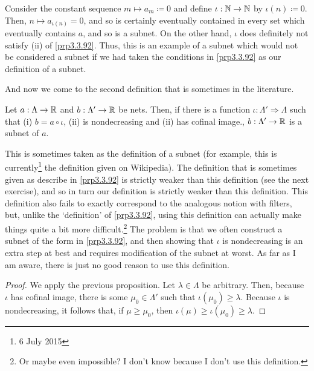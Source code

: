 \begin{exm}\label{exm3.3.93}
Consider the constant sequence $m\mapsto a_m\coloneqq 0$ and define $\iota :\mathbb{N} \rightarrow \mathbb{N}$ by $\iota (n)\coloneqq 0$.  Then, $n\mapsto a_{\iota (n)}=0$, and so is certainly eventually contained in every set which eventually contains $a$, and so is a subnet.  On the other hand, $\iota$ does definitely not satisfy (ii) of \cref{prp3.3.92}.  Thus, this is an example of a subnet which would not be considered a subnet if we had taken the conditions in \cref{prp3.3.92} as our definition of a subnet.
\end{exm}
And now we come to the second definition that is sometimes in the literature.
\begin{prp}\label{prp3.3.93}
Let $a:\Lambda \rightarrow \mathbb{R}$ and $b:\Lambda '\rightarrow \mathbb{R}$ be nets.  Then, if there is a function $\iota :\Lambda '\Rightarrow \Lambda$ such that (i) $b=a\circ \iota$, (ii) is nondecreasing and (ii) has cofinal image., $b:\Lambda '\rightarrow \mathbb{R}$ is a subnet of $a$.
\begin{rmk}
This is sometimes taken as the definition of a subnet (for example, this is currently\footnote{6 July 2015} the definition given on Wikipedia).  The definition that is sometimes given as describe in \cref{prp3.3.92} is strictly weaker than this definition (see the next exercise), and so in turn our definition is strictly weaker than this definition.  This definition also fails to exactly correspond to the analogous notion with filters, but, unlike the `definition' of \cref{prp3.3.92}, using this definition can actually make things quite a bit more difficult.\footnote{Or maybe even impossible?  I don't know because I don't use this definition.}  The problem is that we often construct a subnet of the form in \cref{prp3.3.92}, and then showing that $\iota$ is nondecreasing is an extra step at best and requires modification of the subnet at worst.  As far as I am aware, there is just no good reason to use this definition.
\end{rmk}
\begin{proof}
We apply the previous proposition.  Let $\lambda \in \Lambda$ be arbitrary.  Then, because $\iota$ has cofinal image, there is some $\mu _0\in \Lambda '$ such that $\iota (\mu _0)\geq \lambda$.  Because $\iota$ is nondecreasing, it follows that, if $\mu \geq \mu _0$, then $\iota (\mu )\geq \iota (\mu _0)\geq \lambda$.
\end{proof}
\end{prp}
